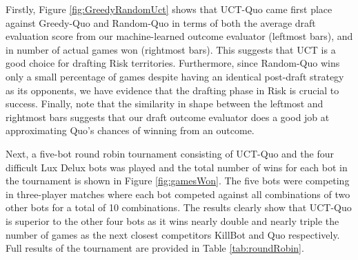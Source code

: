 \documentclass[letterpaper]{article}
\numberwithin{equation}{section}
\numberwithin{theorem}{section}
\numberwithin{lemma}{section}
\numberwithin{df}{section}
\begin{document}
Firstly, Figure \ref{fig:GreedyRandomUct} shows that UCT-Quo came first place against Greedy-Quo and Random-Quo in terms of both the average draft evaluation score from our machine-learned outcome evaluator (leftmost bars), and in number of actual games won (rightmost bars).  This suggests that UCT is a good choice for drafting Risk territories.  Furthermore, since Random-Quo wins only a small percentage of games despite having an identical post-draft strategy as its opponents, we have evidence that the drafting phase in Risk is crucial to success.  Finally, note that the similarity in shape between the leftmost and rightmost bars suggests that our draft outcome evaluator does a good job at approximating Quo's chances of winning from an outcome. 

Next, a five-bot round robin tournament consisting of UCT-Quo and the four difficult Lux Delux bots was played and the total number of wins for each bot in the tournament is shown in Figure \ref{fig:gamesWon}.  The five bots were competing in three-player matches where each bot competed against all combinations of two other bots for a total of 10 combinations.  The results clearly show that UCT-Quo is superior to the other four bots as it wins nearly double and nearly triple the number of games as the next closest competitors KillBot and Quo respectively.  Full results of the tournament are provided in Table \ref{tab:roundRobin}.
\end{document}
